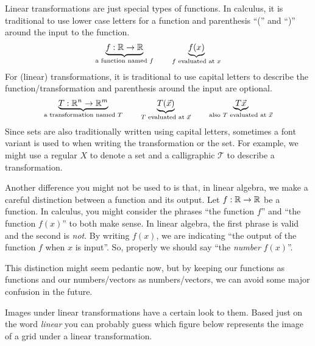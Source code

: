 
Linear transformations are just special types of functions. In calculus, it is traditional to use lower case
letters for a function and parenthesis ``('' and ``)'' around the input to the function.
\[
	\underbrace{f:\mathbb{R}\to\mathbb{R}}_{\text{a function named $f$}}\qquad \underbrace{f(x)}_{\text{$f$ evaluated at $x$}}
\]
For (linear) transformations, it is traditional to use capital letters to describe the function/transformation
and parenthesis around the input are optional.
\[
	\underbrace{T:\mathbb{R}^n\to\mathbb{R}^m}_{\text{a transformation named $T$}}\qquad \underbrace{T(\vec x)}_{\text{$T$ evaluated at $\vec x$}}
	\qquad
	\underbrace{T\vec x}_{\text{also $T$ evaluated at $\vec x$}}
\]
Since sets are also traditionally written using capital letters, sometimes a font variant is used to when writing the transformation
or the set. For example, we might use a regular $X$ to denote a set and a calligraphic $\mathcal T$ to describe a transformation.

\bigskip

Another difference you might not be used to is that, in linear algebra, we make a careful distinction between
a function and its output. Let $f:\mathbb{R}\to\mathbb{R}$ be a function. In calculus, you might consider the phrases ``the function $f$''
and ``the function $f(x)$'' to both make sense. In linear algebra, the first phrase is valid and the second is \emph{not}. By writing
$f(x)$, we are indicating ``the output of the function $f$ when $x$ is input''. So, properly we should say ``the \emph{number} $f(x)$''.

This distinction might seem pedantic now, but by keeping our functions as functions and our numbers/vectors as numbers/vectors,
we can avoid some major confusion in the future.



Images under linear transformations have a certain look to them. Based just on the word
\emph{linear} you can probably guess which figure below represents the image of a grid under
a linear transformation.

